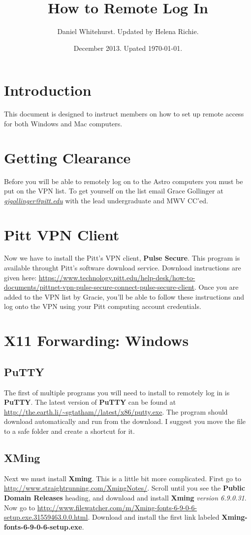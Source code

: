 \documentclass[11pt]{article}
\begin{document}
\title{How to Remote Log In}
\author{
Daniel Whitehurst. Updated by Helena Richie.}
\date{December 2013. Upated \today.}
\maketitle

\section{Introduction}
This document is designed to instruct members on how to set up remote access for both Windows and Mac computers.
\section{Getting Clearance}
Before you will be able to remotely log on to the Astro computers you must be put on the VPN list. To get yourself on the list email Grace Gollinger at \href{mailto:gjgollinger@pitt.edu}{\emph{gjgollinger@pitt.edu}} with the lead undergraduate and MWV CC'ed.


\section{Pitt VPN Client}
Now we have to install the Pitt's VPN client, \textbf{ Pulse Secure}. This program is available throught Pitt's software download service. Download instructions are given here: \url{https://www.technology.pitt.edu/help-desk/how-to-documents/pittnet-vpn-pulse-secure-connect-pulse-secure-client}. Once you are added to the VPN list by Gracie, you'll be able to follow these instructions and log onto the VPN using your Pitt computing account credentials.

\section{X11 Forwarding: Windows}
\subsection{PuTTY}
The first of multiple programs you will need to install to remotely log in is \textbf{PuTTY}. The latest version of \textbf{PuTTY} can be found at \url{http://the.earth.li/~sgtatham//latest/x86/putty.exe}. The program should download automatically and run from the download. I suggest you move the file to a safe folder and create a shortcut for it.

\subsection{XMing}
Next we must install \textbf{Xming}. This is a little bit more complicated. First go to \url{http://www.straightrunning.com/XmingNotes/}.
Scroll until you see the \textbf{Public Domain Releases} heading, and download and install \textbf{Xming} \emph{version 6.9.0.31}. Now go to \url{http://www.filewatcher.com/m/Xming-fonts-6-9-0-6-setup.exe.31559463.0.0.html}. Download and install the first link labeled \textbf{Xming-fonts-6-9-0-6-setup.exe}.
\end{document}
